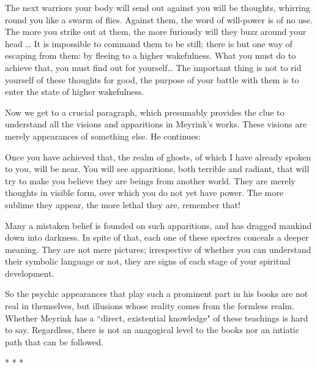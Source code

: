 \begin{quotex}
The next warriors your body will send out against you will be thoughts, whirring round you like a swarm of flies. Against them, the word of will-power is of no use. The more you strike out at them, the more furiously will they buzz around your head … It is impossible to command them to be still; there is but one way of escaping from them: by fleeing to a higher wakefulness. What you must do to achieve that, you must find out for yourself… The important thing is not to rid yourself of these thoughts for good, the purpose of your battle with them is to enter the state of higher wakefulness. 

\end{quotex}
Now we get to a crucial paragraph, which presumably provides the clue to understand all the visions and apparitions in Meyrink's works. These visions are merely appearances of something else. He continues:

\begin{quotex}
Once you have achieved that, the realm of ghosts, of which I have already spoken to you, will be near. You will see apparitions, both terrible and radiant, that will try to make you believe they are beings from another world. They are merely thoughts in visible form, over which you do not yet have power. The more sublime they appear, the more lethal they are, remember that!

Many a mistaken belief is founded on such apparitions, and has dragged mankind down into darkness. In spite of that, each one of these spectres conceals a deeper meaning. They are not mere pictures; irrespective of whether you can understand their symbolic language or not, they are signs of each stage of your spiritual development. 

\end{quotex}
So the psychic appearances that play such a prominent part in his books are not real in themselves, but illusions whose reality comes from the formless realm. Whether Meyrink has a ``direct, existential knowledge" of these teachings is hard to say. Regardless, there is not an anagogical level to the books nor an intiatic path that can be followed.




\begin{center}* * *\end{center}

